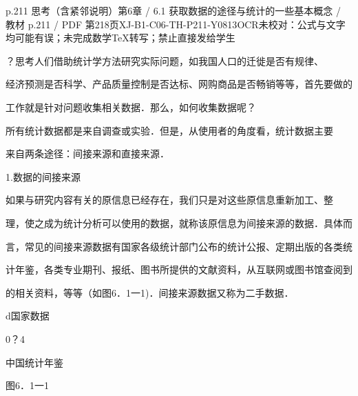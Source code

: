 \begin{bankitem}{p.211 思考（含紧邻说明）}{第6章 / 6.1 获取数据的途径与统计的一些基本概念 / 教材 p.211 / PDF 第218页}{XJ-B1-C06-TH-P211-Y0813}{OCR未校对：公式与文字均可能有误；未完成数学TeX转写；禁止直接发给学生}
\begin{ocrdraft}
\par
？思考人们借助统计学方法研究实际问题，如我国人口的迁徙是否有规律、
\par
经济预测是否科学、产品质量控制是否达标、网购商品是否畅销等等，首先要做的
\par
工作就是针对问题收集相关数据．那么，如何收集数据呢？
\par
所有统计数据都是来自调查或实验．但是，从使用者的角度看，统计数据主要
\par
来自两条途径：间接来源和直接来源．
\par
1.数据的间接来源
\par
如果与研究内容有关的原信息已经存在，我们只是对这些原信息重新加工、整
\par
理，使之成为统计分析可以使用的数据，就称该原信息为间接来源的数据．具体而
\par
言，常见的间接来源数据有国家各级统计部门公布的统计公报、定期出版的各类统
\par
计年鉴，各类专业期刊、报纸、图书所提供的文献资料，从互联网或图书馆查阅到
\par
的相关资料，等等（如图6．1一1)．间接来源数据又称为二手数据．
\par
d国家数据
\par
0？4
\par
中国统计年鉴
\par
图6．1一1
\end{ocrdraft}
\end{bankitem}
